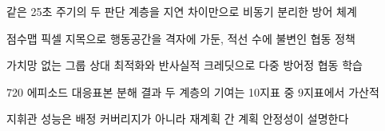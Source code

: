 
\begin{highlights}
\item 같은 25초 주기의 두 판단 계층을 지연 차이만으로 비동기 분리한 방어 체계
\item 점수맵 픽셀 지목으로 행동공간을 격자에 가둔, 적선 수에 불변인 협동 정책
\item 가치망 없는 그룹 상대 최적화와 반사실적 크레딧으로 다중 방어정 협동 학습
\item 720 에피소드 대응표본 분해 결과 두 계층의 기여는 10지표 중 9지표에서 가산적
\item 지휘관 성능은 배정 커버리지가 아니라 재계획 간 계획 안정성이 설명한다
\end{highlights}
